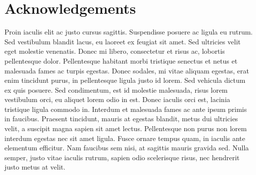 \chapter*{Acknowledgements}

Proin iaculis elit ac justo cursus sagittis. Suspendisse posuere ac ligula eu rutrum. Sed vestibulum blandit lacus, eu laoreet ex feugiat sit amet. Sed ultricies velit eget molestie venenatis. Donec mi libero, consectetur et risus ac, lobortis pellentesque dolor. Pellentesque habitant morbi tristique senectus et netus et malesuada fames ac turpis egestas. Donec sodales, mi vitae aliquam egestas, erat enim tincidunt purus, in pellentesque ligula justo id lorem. Sed vehicula dictum ex quis posuere. Sed condimentum, est id molestie malesuada, risus lorem vestibulum orci, eu aliquet lorem odio in est. Donec iaculis orci est, lacinia tristique ligula commodo in. Interdum et malesuada fames ac ante ipsum primis in faucibus. Praesent tincidunt, mauris at egestas blandit, metus dui ultricies velit, a suscipit magna sapien sit amet lectus. Pellentesque non purus non lorem interdum egestas nec sit amet ligula. Fusce ornare tempus quam, in iaculis ante elementum efficitur. Nam faucibus sem nisi, at sagittis mauris gravida sed. Nulla semper, justo vitae iaculis rutrum, sapien odio scelerisque risus, nec hendrerit justo metus at velit. 
